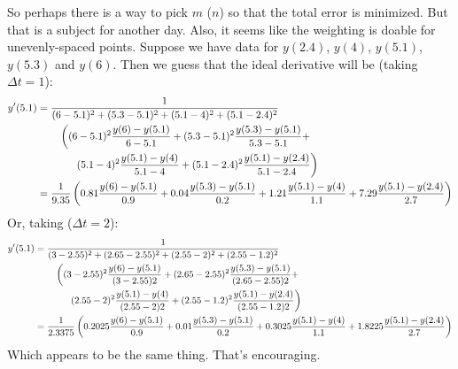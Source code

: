 \documentclass{amsart}
\begin{document}
So perhaps there is a way to pick $m$ ($n$) so that the total error is
minimized.  But that is a subject for another day.  Also, it seems like the 
weighting is doable for unevenly-spaced points.  Suppose we have data for
$y(2.4)$, $y(4)$, $y(5.1)$, $y(5.3)$ and $y(6)$.  Then we guess that the 
ideal derivative will be (taking $\Delta t = 1$):
\begin{align*}
y'(5.1) & = 
  \frac{1}{(6 - 5.1)^2 + (5.3 - 5.1)^2 + (5.1 - 4)^2 + (5.1 - 2.4)^2} \\
& \hspace{0.3in}
  \left( (6 - 5.1)^2 \frac{y(6) - y(5.1)}{6 - 5.1} +
         (5.3 - 5.1)^2 \frac{y(5.3) - y(5.1)}{5.3 - 5.1} + \right. \\
& \hspace{0.5in}
  \left. (5.1 - 4)^2 \frac{y(5.1) - y(4)}{5.1 - 4} +
         (5.1 - 2.4)^2 \frac{y(5.1) - y(2.4)}{5.1 - 2.4} \right) \\
& = \frac{1}{9.35}
  \left( 0.81 \frac{y(6) - y(5.1)}{0.9} + 
         0.04 \frac{y(5.3) - y(5.1)}{0.2} +
         1.21 \frac{y(5.1) - y(4)}{1.1} +
         7.29 \frac{y(5.1) - y(2.4)}{2.7} \right)
\end{align*}
Or, taking ($\Delta t = 2$):
\begin{align*}
y'(5.1) & = 
  \frac{1}{(3 - 2.55)^2 + (2.65 - 2.55)^2 + (2.55 - 2)^2 + (2.55 - 1.2)^2} \\
& \hspace{0.3in}
  \left( (3 - 2.55)^2 \frac{y(6) - y(5.1)}{(3 - 2.55) 2} +
         (2.65 - 2.55)^2 \frac{y(5.3) - y(5.1)}{(2.65 - 2.55) 2} + \right. \\
& \hspace{0.5in}
  \left. (2.55 - 2)^2 \frac{y(5.1) - y(4)}{(2.55 - 2) 2} + 
         (2.55 - 1.2)^2 \frac{y(5.1) - y(2.4)}{(2.55 - 1.2) 2} \right) \\
& = \frac{1}{2.3375}
  \left( 0.2025 \frac{y(6) - y(5.1)}{0.9} +
         0.01 \frac{y(5.3) - y(5.1)}{0.2} +
         0.3025 \frac{y(5.1) - y(4)}{1.1} +
         1.8225 \frac{y(5.1) - y(2.4)}{2.7} \right) 
\end{align*}
Which appears to be the same thing.  That's encouraging.
\end{document}
